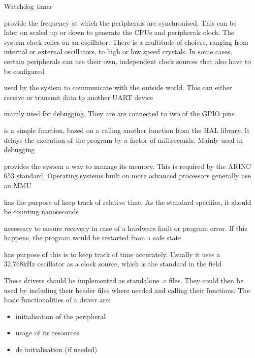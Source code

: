 \begin{labeling}{Watchdog timer}
	\item [\textbf{System Clock}] provide the frequency at which the
	peripherals are synchronised. This can be later on scaled up or down
	to generate the CPU\textquotesingle s and peripherals\textquotesingle
	clock.
	The system clock relies on an oscillator.
	There is a multitude of choices, ranging from internal or external
	oscillators, to high or low speed crystals. In some cases, certain
	peripherals can use their own, independent clock sources that also have
	to be configured
	\item [\textbf{UART}] used by the system to communicate with the outside
	world. This can either receive or transmit data to another UART device
	\item [\textbf{LEDs}] mainly used for debugging. They are
	are connected to two of the GPIO pins
	\item [\textbf{Delay}] is a simple function, based on a calling another
	function from the HAL library. It delays the execution 
	of the program by a factor of milliseconds. Mainly used in debugging
	\item [\textbf{MPU}] provides the system a way to manage its
	memory. This is required by the ARINC 653 standard. 
	Operating systems built on more advanced processors generally use 
	an MMU
	\item [\textbf{Timing}] has the purpose of keep track of 
	relative time. As the standard specifies, it should be counting 
	nanoseconds
	\item [\textbf{Watchdog timer}] necessary to ensure recovery
	in case of a hardware fault or program error. If this happens, the
	program would be restarted from a safe state
	\item [\textbf{RTC}] has purpose of this is to keep track of 
	time accurately. Usually it uses  a 32,768kHz oscillator as a 
	clock source, which is the standard in the field
	
\end{labeling}

These drivers should be implemented as standalone .c files. They could then
be used by including their header files where needed and calling their
functions.
The basic functionalities of a driver are:
\begin{itemize}[noitemsep]
	\item initialisation of the peripheral
	\item usage of its resources
	\item de initialisation (if needed) 
\end{itemize}

